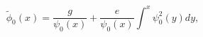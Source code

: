 \begin{equation}\label{gensol2}
\tilde\phi_0(x)= \frac{g}{\psi_0(x)}+\frac{e}{\psi_0(x)}\int^x\psi_0^2(y)dy,
\end{equation}


